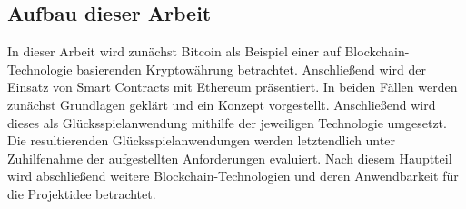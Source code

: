\subsection{Aufbau dieser Arbeit}
In dieser Arbeit wird zunächst Bitcoin als Beispiel einer auf Blockchain-Technologie basierenden Kryptowährung betrachtet. Anschließend wird der Einsatz von Smart Contracts mit Ethereum präsentiert. In beiden Fällen werden zunächst Grundlagen geklärt und ein Konzept vorgestellt. Anschließend wird dieses als Glücksspielanwendung mithilfe der jeweiligen Technologie umgesetzt. Die resultierenden Glücksspielanwendungen werden letztendlich unter Zuhilfenahme der aufgestellten Anforderungen evaluiert. Nach diesem Hauptteil wird abschließend weitere Blockchain-Technologien und deren Anwendbarkeit für die Projektidee betrachtet.
